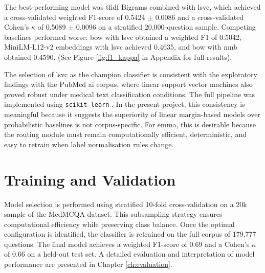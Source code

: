 The best-performing model was \gls{tfidf} Bigrams combined with \gls{lsvc}, which achieved a cross-validated weighted F1-score of 0.5424 $\pm$ 0.0086 and a cross-validated Cohen's $\kappa$ of 0.5089 $\pm$ 0.0096 on a stratified 20,000-question sample. Competing baselines performed worse: \gls{bow} with \gls{lsvc} obtained a weighted F1 of 0.5042, MiniLM-L12-v2 embeddings with \gls{lsvc} achieved 0.4635, and \gls{bow} with \gls{mnb} obtained 0.4590. (See Figure \ref{fig:f1_kappa} in Appendix for full results).

The selection of \gls{lsvc} \cite{fan_liblinear_2008} as the champion classifier is consistent with the exploratory findings with the PubMed \gls{ai} corpus, where linear support vector machines also proved robust under medical text classification conditions. The full pipeline was implemented using \texttt{scikit-learn} \cite{pedregosa_scikitlearn_2011}. In the present project, this consistency is meaningful because it suggests the superiority of linear margin-based models over probabilistic baselines is not corpus-specific. For \gls{emma}, this is desirable because the routing module must remain computationally efficient, deterministic, and easy to retrain when label normalisation rules change. 

\section{Training and Validation}
Model selection is performed using stratified 10-fold cross-validation on a 20k sample of the MedMCQA dataset. This subsampling strategy ensures computational efficiency while preserving class balance. Once the optimal configuration is identified, the classifier is retrained on the full corpus of 179,777 questions. The final model achieves a weighted F1-score of 0.69 and a Cohen's $\kappa$ of 0.66 on a held-out test set. A detailed evaluation and interpretation of model performance are presented in Chapter \ref{ch:evaluation}.